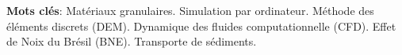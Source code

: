 \begin{resumo}[Résumé]
    \textbf{Mots clés}: Matériaux granulaires. Simulation par ordinateur. Méthode des éléments discrets (DEM). Dynamique des fluides computationnelle (CFD). Effet de Noix du Brésil (BNE). Transporte de sédiments.


\end{resumo}

